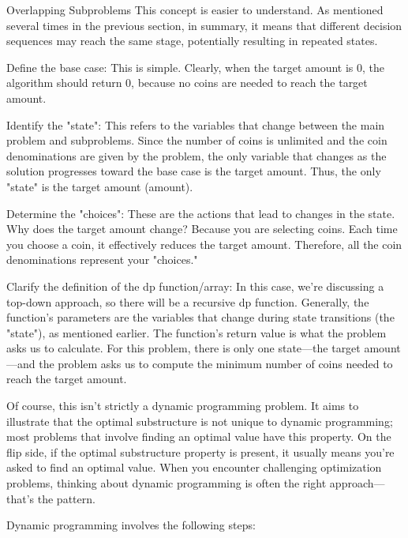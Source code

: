 \documentclass[a4paper,11pt,twoside]{book}
\begin{document}
	\par Overlapping Subproblems
	This concept is easier to understand. As mentioned several times in the previous section, in summary, it means that different decision sequences may reach the same stage, potentially resulting in repeated states.
	
		
	\par Define the base case: This is simple. Clearly, when the target amount is 0, the algorithm should return 0, because no coins are needed to reach the target amount.
	
	\par Identify the "state": This refers to the variables that change between the main problem and subproblems. Since the number of coins is unlimited and the coin denominations are given by the problem, the only variable that changes as the solution progresses toward the base case is the target amount. Thus, the only "state" is the target amount (amount).
	
	\par Determine the "choices": These are the actions that lead to changes in the state. Why does the target amount change? Because you are selecting coins. Each time you choose a coin, it effectively reduces the target amount. Therefore, all the coin denominations represent your "choices."
	
	\par Clarify the definition of the dp function/array: In this case, we're discussing a top-down approach, so there will be a recursive dp function. Generally, the function's parameters are the variables that change during state transitions (the "state"), as mentioned earlier. The function's return value is what the problem asks us to calculate. For this problem, there is only one state—the target amount—and the problem asks us to compute the minimum number of coins needed to reach the target amount.
	
	\par Of course, this isn’t strictly a dynamic programming problem. It aims to illustrate that the optimal substructure is not unique to dynamic programming; most problems that involve finding an optimal value have this property. On the flip side, if the optimal substructure property is present, it usually means you’re asked to find an optimal value. When you encounter challenging optimization problems, thinking about dynamic programming is often the right approach—that’s the pattern.
	
	Dynamic programming involves the following steps:
	
\end{document}
